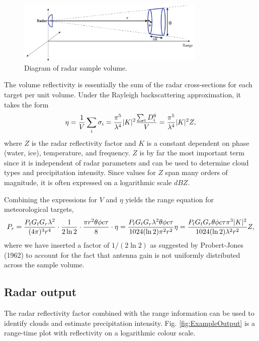 \documentclass{article}
\DeclarePairedDelimiter\abs{\lvert}{\rvert}%
\begin{document}
\begin{figure}[h!]
	\centering
	\includegraphics[width=0.8\textwidth]{volume}
	\caption{Diagram of radar sample volume.\supercite{Gorka}}
	\label{fig:Volume}
\end{figure}

The volume reflectivity is essentially the sum of the radar cross-sections for each target per unit volume. Under the Rayleigh backscattering approximation, it takes the form\supercite{FirstCourse}
\begin{equation}
	\eta = \frac{1}{V}\sum_i{\sigma_i} = \frac{\pi^5}{\lambda^4} \abs{K}^2 \frac{\sum_i{D_i^6}}{V} = \frac{\pi^5}{\lambda^4} \abs{K}^2 Z,
\end{equation}
where \(Z\) is the radar reflectivity factor and \(K\) is a constant dependent on phase (water, ice), temperature, and frequency. \(Z\) is by far the most important term since it is independent of radar parameters and can be used to determine cloud types and precipitation intensity. Since values for \(Z\) span many orders of magnitude, it is often expressed on a logarithmic scale \(dBZ\).

Combining the expressions for \(V\) and \(\eta\) yields the range equation for meteorological targets,\supercite{RadarHandbookMeteo}
\begin{equation}
	P_r = \frac{P_t G_t G_r \lambda^2}{(4 \pi)^3 r^4} \cdot \frac{1}{2\ln{2}} \cdot \frac{\pi r^2 \theta \phi c \tau}{8} \cdot \eta = \frac{P_t G_t G_r \lambda^2 \theta \phi c \tau}{1024 (\ln{2}) \pi^2 r^2} \eta = \frac{P_t G_t G_r \theta \phi c \tau \pi^3 \abs{K}^2}{1024 (\ln{2}) \lambda^2 r^2} Z,
	\label{eqn:MeteoRange}
\end{equation}
where we have inserted a factor of \(1/(2\ln{2})\) as suggested by Probert-Jones (1962)\supercite{ProbertJones} to account for the fact that antenna gain is not uniformly distributed across the sample volume.

\subsection{Radar output}
The radar reflectivity factor combined with the range information can be used to identify clouds and estimate precipitation intensity. Fig. \ref{fig:ExampleOutput} is a range-time plot with reflectivity on a logarithmic colour scale.
\end{document}
